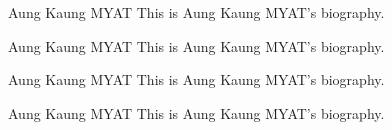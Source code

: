 
\begin{IEEEbiography}{Aung Kaung MYAT}
This is Aung Kaung MYAT's biography.  
\end{IEEEbiography}

\begin{IEEEbiography}{Aung Kaung MYAT}
This is Aung Kaung MYAT's biography.  
\end{IEEEbiography}

\begin{IEEEbiography}{Aung Kaung MYAT}
This is Aung Kaung MYAT's biography.  
\end{IEEEbiography}

\begin{IEEEbiography}{Aung Kaung MYAT}
This is Aung Kaung MYAT's biography.  
\end{IEEEbiography}